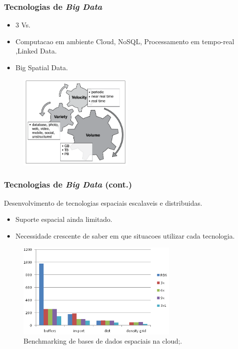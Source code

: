 \documentclass[hyperref={pdfpagelabels=true}]{beamer}
\begin{document}
\begin{frame}
\frametitle{Tecnologias de \textit{Big Data}}

      \begin{itemize}      
        \item<1->3 Vs.
        \item<2->Computacao em ambiente Cloud, NoSQL, Processamento em tempo-real ,Linked Data.%
        \item<4->Big Spatial Data.
      \end{itemize}                
    \begin{figure}   
         \includegraphics[width=0.5\textwidth]{3vs.png}
    \end{figure} 

\end{frame}


\frametitle{Tecnologias de \textit{Big Data} (cont.)}
\begin{frame}
Desenvolvimento de tecnologias espaciais escalaveis e distribuidas.
      \begin{itemize}      
        \item<2->Suporte espacial ainda limitado.%
        \item<3->Necessidade crescente de saber em que situacoes utilizar cada tecnologia.%
      \end{itemize}                
    \begin{figure}   
         \includegraphics[width=0.7\textwidth]{general1.png}\\
         \tiny{Benchmarking de bases de dados espaciais na cloud;.}%
    \end{figure} 
\end{frame}
\end{document}
